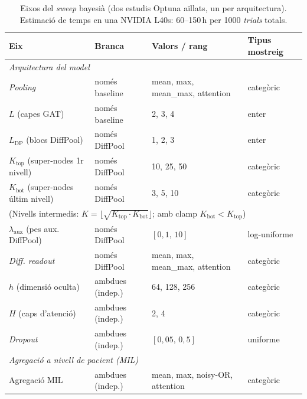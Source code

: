 \documentclass[10pt,a4paper,twocolumn,twoside]{article}
\begin{document}
\begin{table}[H]
\centering
\caption{Eixos del \textit{sweep} bayesià (dos estudis Optuna aïllats, un per arquitectura).
Estimació de temps en una NVIDIA L40s: 60--150\,h per 1000 \textit{trials} totals.}
\label{tab:sweep-config}
\small
\renewcommand{\arraystretch}{1.05}
\begin{tabular}{p{2.8cm}p{2.4cm}p{5.6cm}p{3.2cm}}
\toprule
\textbf{Eix} & \textbf{Branca} & \textbf{Valors / rang} & \textbf{Tipus mostreig} \\
\midrule
\multicolumn{4}{l}{\textit{Arquitectura del model}} \\[2pt]
\textit{Pooling}        & només baseline     & mean, max, mean\_max, attention                 & categòric \\
$L$ (capes GAT)         & només baseline     & 2, 3, 4                                         & enter \\
$L_{\text{DP}}$ (blocs DiffPool) & només DiffPool & 1, 2, 3                                  & enter \\
$K_{\text{top}}$ (super-nodes 1r nivell) & només DiffPool & 10, 25, 50               & categòric \\
$K_{\text{bot}}$ (super-nodes últim nivell) & només DiffPool & 3, 5, 10             & categòric \\
\multicolumn{4}{l}{\quad\footnotesize(Nivells intermedis: $K = \lfloor\sqrt{K_{\text{top}} \cdot K_{\text{bot}}}\rfloor$; amb clamp $K_{\text{bot}} < K_{\text{top}}$)} \\[2pt]
$\lambda_{\text{aux}}$ (pes aux. DiffPool) & només DiffPool & $[0{,}1,\,10]$         & log-uniforme \\
\textit{Diff. readout}  & només DiffPool     & mean, max, mean\_max, attention                 & categòric \\
$h$ (dimensió oculta)   & ambdues (indep.)   & 64, 128, 256                                    & categòric \\
$H$ (caps d'atenció)    & ambdues (indep.)   & 2, 4                                            & categòric \\
\textit{Dropout}        & ambdues (indep.)   & $[0{,}05,\,0{,}5]$                              & uniforme \\
\midrule
\multicolumn{4}{l}{\textit{Agregació a nivell de pacient (MIL)}} \\[2pt]
Agregació MIL           & ambdues (indep.)   & mean, max, noisy-OR, attention                  & categòric \\
\midrule

\end{tabular}
\end{table}
\end{document}
